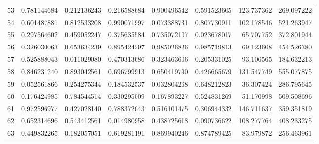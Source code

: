\begin{longtable}{rrrrrrrr}
53 & 0.781144684 & 0.212136243 & 0.216588684 & 0.900496542 & 0.591523605 & 123.737362 & 269.097222 \\
54 & 0.601487881 & 0.812533208 & 0.990071997 & 0.073388731 & 0.807730911 & 102.178546 & 521.263947 \\
55 & 0.297564602 & 0.459052247 & 0.375635584 & 0.735072107 & 0.023678017 & 65.707752 & 372.801944 \\
56 & 0.326030063 & 0.653634239 & 0.895424297 & 0.985026826 & 0.985719813 & 69.123608 & 454.526380 \\
57 & 0.525888043 & 0.011029080 & 0.470313686 & 0.323463606 & 0.205331025 & 93.106565 & 184.632213 \\
58 & 0.846231240 & 0.893042561 & 0.696799913 & 0.650419790 & 0.426665679 & 131.547749 & 555.077875 \\
59 & 0.052561866 & 0.254275344 & 0.184532537 & 0.032804268 & 0.648212823 & 36.307424 & 286.795645 \\
60 & 0.176424985 & 0.784544514 & 0.330295009 & 0.167893227 & 0.524831269 & 51.170998 & 509.508696 \\
61 & 0.972596977 & 0.427028140 & 0.788372643 & 0.516101475 & 0.306944332 & 146.711637 & 359.351819 \\
62 & 0.652314696 & 0.543412561 & 0.014980958 & 0.438725618 & 0.090736622 & 108.277764 & 408.233275 \\
63 & 0.449832265 & 0.182057051 & 0.619281191 & 0.869940246 & 0.874789425 & 83.979872 & 256.463961 \\
\bottomrule
\end{longtable}
